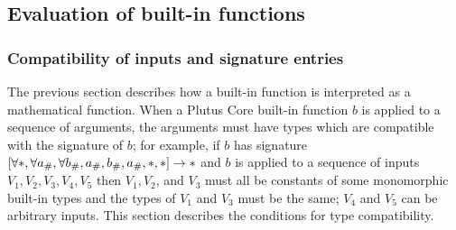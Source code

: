 


\subsection{Evaluation of built-in functions}
\label{sec:builtin-evaluation}

\subsubsection{Compatibility of inputs and signature entries}
\label{sec:compatibility}
The previous section describes how a built-in function is interpreted as a
mathematical function.  When a Plutus Core built-in function $b$ is applied to a
sequence of arguments, the arguments must have types which are compatible with
the signature of $b$; for example, if $b$ has signature
$[\forallStar, \forall a_\#, \forall b_\#, a_\#, b_\#, a_\#, \star, \star] \rightarrow \star$ and $b$
is applied to a
sequence of inputs $V_1, V_2, V_3, V_4, V_5$ then $V_1, V_2$, and $V_3$ must all
be constants of some monomorphic built-in types and the types of $V_1$ and $V_3$
must be the same; $V_4$ and $V_5$ can be arbitrary inputs.  This section
describes the conditions for type compatibility.


